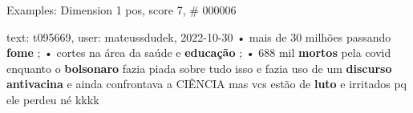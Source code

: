 \begin{frame}{Examples: Dimension 1 pos, score 7, \# 000006}
\footnotesize
\begin{exampleblock}{text: t095669, user: mateussdudek, 2022-10-30}
• mais de 30 milhões passando \textbf{fome} ; • cortes na área da saúde e 
\textbf{educação} ; • 688 mil \textbf{mortos} pela covid enquanto o 
\textbf{bolsonaro} fazia piada sobre tudo isso e fazia uso de um 
\textbf{discurso} \textbf{antivacina} e ainda confrontava a CIÊNCIA mas vcs 
estão de \textbf{luto} e irritados pq ele perdeu né kkkk 
\end{exampleblock}
\end{frame}
